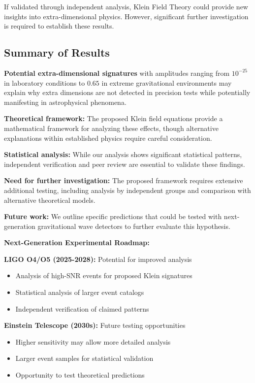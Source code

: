 \documentclass[12pt]{iopart}
\begin{document}
If validated through independent analysis, Klein Field Theory could provide new insights into extra-dimensional physics. However, significant further investigation is required to establish these results.

\subsection{Summary of Results}

\textbf{Potential extra-dimensional signatures} with amplitudes ranging from $10^{-25}$ in laboratory conditions to $0.65$ in extreme gravitational environments may explain why extra dimensions are not detected in precision tests while potentially manifesting in astrophysical phenomena.

\textbf{Theoretical framework:} The proposed Klein field equations provide a mathematical framework for analyzing these effects, though alternative explanations within established physics require careful consideration.

\textbf{Statistical analysis:} While our analysis shows significant statistical patterns, independent verification and peer review are essential to validate these findings.

\textbf{Need for further investigation:} The proposed framework requires extensive additional testing, including analysis by independent groups and comparison with alternative theoretical models.

\textbf{Future work:} We outline specific predictions that could be tested with next-generation gravitational wave detectors to further evaluate this hypothesis.

\textbf{Next-Generation Experimental Roadmap:}

\textbf{LIGO O4/O5 (2025-2028):} Potential for improved analysis
\begin{itemize}
\item Analysis of high-SNR events for proposed Klein signatures
\item Statistical analysis of larger event catalogs
\item Independent verification of claimed patterns
\end{itemize}

\textbf{Einstein Telescope (2030s):} Future testing opportunities
\begin{itemize}
\item Higher sensitivity may allow more detailed analysis
\item Larger event samples for statistical validation
\item Opportunity to test theoretical predictions
\end{itemize}
\end{document}
